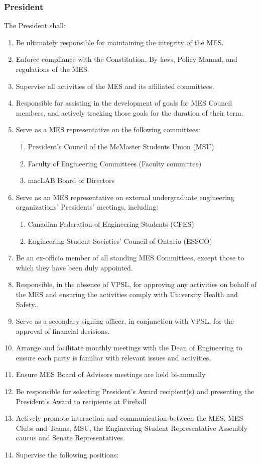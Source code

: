 \subsubsection{President}
\label{president}

The President shall:

\begin{enumerate}
 \item
  Be ultimately responsible for maintaining the integrity of the MES.
 \item
  Enforce compliance with the Constitution, By-laws, Policy Manual, and regulations of the MES.
 \item
  Supervise all activities of the MES and its affiliated committees.
 \item
  Responsible for assisting in the development of goals for MES Council members, and actively tracking those goals for the duration of their term.
 \item
  Serve as a MES representative on the following committees:

  \begin{enumerate}
   \item
    President's Council of the McMaster Students Union (MSU)
   \item
    Faculty of Engineering Committees (Faculty committee)
   \item
    macLAB Board of Directors
  \end{enumerate}
 \item
  Serve as an MES representative on external undergraduate engineering organizations' Presidents' meetings, including:

  \begin{enumerate}
   \item
    Canadian Federation of Engineering Students (CFES)
   \item
    Engineering Student Societies' Council of Ontario (ESSCO)
  \end{enumerate}
 \item
  Be an ex-officio member of all standing MES Committees, except those to which they have been duly appointed.
 \item
  Responsible, in the absence of VPSL, for approving any activities on behalf of the MES and ensuring the activities comply with University Health and Safety..
 \item
  Serve as a secondary signing officer, in conjunction with VPSL, for the approval of financial decisions.
 \item
  Arrange and facilitate monthly meetings with the Dean of Engineering to ensure each party is familiar with relevant issues and activities.
 \item
  Ensure MES Board of Advisors meetings are held bi-annually
 \item
  Be responsible for selecting President's Award recipient(s) and presenting the President's Award to recipients at Fireball
 \item
  Actively promote interaction and communication between the MES, MES Clubs and Teams, MSU, the Engineering Student Representative Assembly caucus and Senate Representatives.
 \item
  Supervise the following positions:


\end{enumerate}
